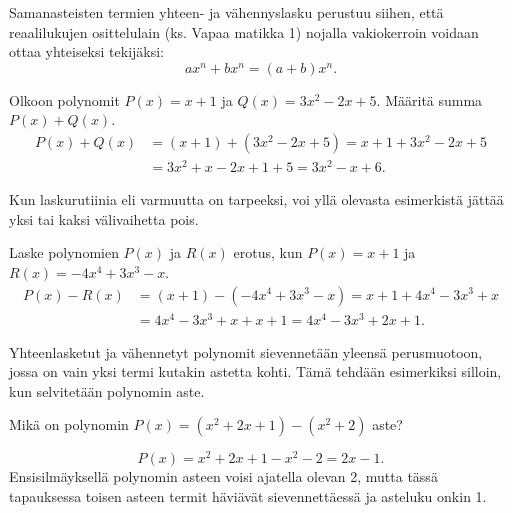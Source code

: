 Samanasteisten termien yhteen- ja vähennyslasku perustuu siihen, että reaalilukujen osittelulain (ks. Vapaa matikka 1) nojalla vakiokerroin voidaan
ottaa yhteiseksi tekijäksi:
\[
ax^n+bx^n=(a+b)x^n.
\]

  
\begin{esimerkki}
Olkoon polynomit $P(x)=x+1$ ja $Q(x)=3x^2-2x+5$. Määritä summa $P(x)+Q(x)$.
   \begin{align*}
        P(x)+Q(x)&=(x+1)+(3x^2-2x+5) = x+1+3x^2-2x+5 \\
                 &= 3x^2+x-2x+1+5 =3x^2-x+6.
    \end{align*}
\end{esimerkki}

Kun laskurutiinia eli varmuutta on tarpeeksi, voi yllä olevasta esimerkistä jättää yksi tai kaksi välivaihetta pois.


\begin{esimerkki}
    Laske polynomien $P(x)$ ja $R(x)$ erotus, kun $P(x)=x+1$ ja $R(x)=-4x^4+3x^3-x$.
   \begin{align*}
        P(x)-R(x) & =(x+1)-(-4x^4+3x^3-x) =x+1+4x^4-3x^3+x \\
        & =4x^4-3x^3+x+x+1 = 4x^4-3x^3+2x+1.
    \end{align*}
\end{esimerkki}

Yhteenlasketut ja vähennetyt polynomit sievennetään yleensä perusmuotoon, jossa on vain yksi termi kutakin astetta kohti. Tämä tehdään esimerkiksi silloin, kun selvitetään polynomin aste.

\begin{esimerkki} Mikä on polynomin $P(x)=(x^2+2x+1)-(x^2+2)$ aste?

\[
P(x)=x^2+2x+1-x^2-2=2x-1.
\]
Ensisilmäyksellä polynomin asteen voisi ajatella olevan 2, mutta tässä tapauksessa toisen asteen termit häviävät sievennettäessä ja asteluku onkin 1.
\end{esimerkki}


